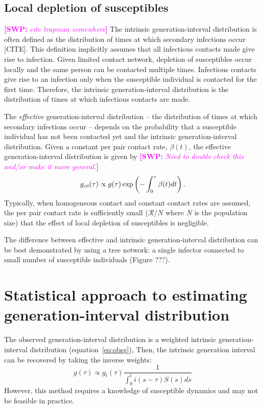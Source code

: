 \documentclass{article}
\newcommand{\RR}{\ensuremath{{\mathcal R}}}
\newcommand{\tsub}[2]{#1_{{\textrm{\tiny #2}}}}
\newcommand{\comment}[3]{\textcolor{#1}{\textbf{[#2: }\textsl{#3}\textbf{]}}}
\newcommand{\swp}[1]{\comment{magenta}{SWP}{#1}}
\begin{document}
\subsection{Local depletion of susceptibles}

\swp{cite trapman somewhere}
The intrinsic generation-interval distribution is often defined as the distribution of times at which secondary infections occur [CITE].
This definition implicitly assumes that all infectious contacts made give rise to infection. 
Given limited contact network, depletion of susceptibles occur locally and the same person can be contacted multiple times.
Infectious contacts give rise to an infection only when the susceptible individual is contacted for the first time.
Therefore, the intrinsic generation-interval distribution is the distribution of times at which infectious contacts are made.

The \emph{effective} generation-interval distribution -- the distribution of times at which secondary infections occur -- depends on the probability that a susceptible individual has not been contacted yet and the intrinsic generation-interval distribution.
Given a constant per pair contact rate, $\beta(t)$, the effective generation-interval distribution is given by \swp{Need to double check this and/or make it more general.}
\begin{equation}
\tsub{g}{eff}(\tau) \propto g(\tau) \exp\left(-\int_0^{\tau} \beta(t) dt\right).
\end{equation}
Typically, when homogeneous contact and constant contact rates are assumed,
the per pair contact rate is sufficiently small ($\RR/N$ where $N$ is the population size) that the effect of local depletion of susceptibles is negligible.

The difference between effective and intrinsic generation-interval distribution can be best demonstrated by using a tree network: a single infector connected to small number of susceptible individuals (Figure ???).




\section{Statistical approach to estimating generation-interval distribution}

The observed generation-interval distribution is a weighted intrinsic generation-interval distribution (equation~\ref{eq:obsg}),
Then, the intrinsic generation interval can be recovered by taking the inverse weights:
\begin{equation}
g(\tau) \propto g_t(\tau) \frac{1}{\int_{0}^t i(s-\tau) S(s) ds}
\end{equation}
However, this method requires a knowledge of susceptible dynamics and may not be feasible in practice.
\end{document}
